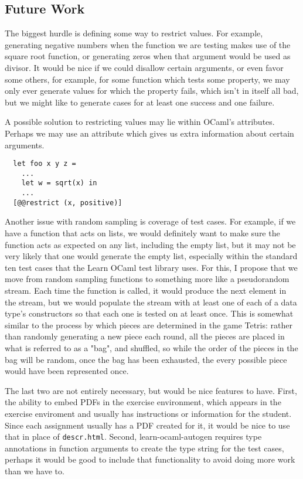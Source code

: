 \documentclass[11pt]{article}
\begin{document}
\subsection{Future Work}
The biggest hurdle is defining some way to restrict values. For example, generating negative numbers when the function we are testing makes use of the square root function, or generating zeros when that argument would be used as divisor. It would be nice if we could disallow certain arguments, or even favor some others, for example, for some function which tests some property, we may only ever generate values for which the property fails, which isn't in itself all bad, but we might like to generate cases for at least one success and one failure.

A possible solution to restricting values may lie within OCaml's attributes. Perhaps we may use an attribute which gives us extra information about certain arguments.

\begin{lstlisting}
  let foo x y z =
    ...
    let w = sqrt(x) in
    ...
  [@@restrict (x, positive)]
\end{lstlisting}

Another issue with random sampling is coverage of test cases. For example, if we have a function that acts on lists, we would definitely want to make sure the function acts as expected on any list, including the empty list, but it may not be very likely that one would generate the empty list, especially within the standard ten test cases that the Learn OCaml test library uses. For this, I propose that we move from random sampling functions to something more like a pseudorandom stream. Each time the function is called, it would produce the next element in the stream, but we would populate the stream with at least one of each of a data type's constructors so that each one is tested on at least once. This is somewhat similar to the process by which pieces are determined in the game Tetris: rather than randomly generating a new piece each round, all the pieces are placed in what is referred to as a "bag", and shuffled, so while the order of the pieces in the bag will be random, once the bag has been exhausted, the every possible piece would have been represented once.

The last two are not entirely necessary, but would be nice features to have. First, the ability to embed PDFs in the exercise environment, which appears in the exercise enviroment and usually has instructions or information for the student. Since each assignment usually has a PDF created for it, it would be nice to use that in place of \verb+descr.html+. Second, learn-ocaml-autogen requires type annotations in function arguments to create the type string for the test cases, perhaps it would be good to include that functionality to avoid doing more work than we have to.

{}

\end{document}
